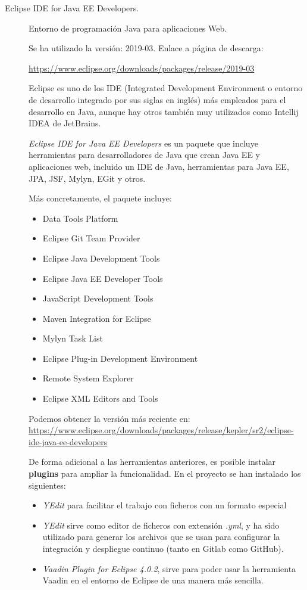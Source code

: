 \begin{description}
	\item[Eclipse IDE for Java EE Developers.] Entorno de programación Java para aplicaciones Web. 
	
		Se ha utilizado la versión: 2019-03. Enlace a página de descarga:
		
		\url{https://www.eclipse.org/downloads/packages/release/2019-03}
	
		Eclipse es uno de los IDE (Integrated Development Environment o entorno de desarrollo integrado por sus siglas en inglés) más empleados para el desarrollo en Java, aunque hay otros también muy utilizados como Intellij IDEA de JetBrains.
		
		\textit{Eclipse IDE for Java EE Developers} es un paquete que incluye herramientas para desarrolladores de Java que crean Java EE y aplicaciones web, incluido un IDE de Java, herramientas para Java EE, JPA, JSF, Mylyn, EGit y otros.
		
Más concretamente, el paquete incluye:
\begin{itemize}
\item Data Tools Platform
\item Eclipse Git Team Provider
\item Eclipse Java Development Tools
\item Eclipse Java EE Developer Tools
\item JavaScript Development Tools
\item Maven Integration for Eclipse
\item Mylyn Task List
\item Eclipse Plug-in Development Environment
\item Remote System Explorer
\item Eclipse XML Editors and Tools
\end{itemize}

Podemos obtener la versión más reciente en: \url{https://www.eclipse.org/downloads/packages/release/kepler/sr2/eclipse-ide-java-ee-developers}
		
		De forma adicional a las herramientas anteriores, es posible instalar \textbf{plugins} para ampliar la funcionalidad. En el proyecto se han instalado los siguientes:
	\begin{itemize}
		\item \textit{YEdit} para facilitar el trabajo con ficheros con un formato especial
		\item \textit{YEdit} sirve como editor de ficheros con extensión \textit{.yml}, y ha sido utilizado para generar los archivos que se usan para configurar la integración y despliegue continuo (tanto en Gitlab como GitHub).
		\item \textit{Vaadin Plugin for Eclipse 4.0.2}, sirve para poder usar la herramienta Vaadin en el entorno de Eclipse de una manera más sencilla.
	\end{itemize}
		

\end{description}
